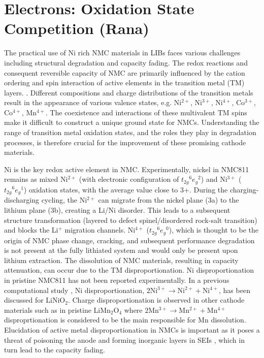 \documentclass[journal=jacsat,manuscript=article]{achemso}
\begin{document}
\section{Electrons: Oxidation State Competition (Rana)}
The practical use of Ni rich NMC materials in LIBs faces various challenges including structural degradation and capacity fading.  The redox reactions and consequent reversible capacity of NMC are primarily influenced by the cation ordering and spin interaction of active elements in the transition metal (TM) layers. \cite{Li-acsami-2020,Maleki-aenm.2019,Feng-2019, Xia2018, Xiao_NanoEner2018}. Different compositions and charge distributions of the transition metals result in the appearance of various valence states, e.g. Ni$^{2+}$, Ni$^{3+}$, Ni$^{4+}$, Co$^{3+}$, Co$^{4+}$, Mn$^{4+}$. \cite{Xiao_NanoEner2018} The coexistence and interactions of these multivalent TM spins make it difficult to construct a unique ground state for NMCs. \cite{Xiao_NanoEner2018} 
Understanding the range of transition metal oxidation states, and the roles they play in degradation processes, is therefore crucial for the improvement of these promising cathode materials.

Ni is the key redox active element in NMC. Experimentally, nickel in NMC811 remains as mixed Ni$^{2+}$ (with electronic configuration of ${t_{2g}}^{6}{e_{g}}^{2}$) and Ni$^{3+}$ (${t_{2g}}^{6}{e_{g}}^{1}$) oxidation states, with the average value close to 3+. \cite{Zhu_JMatChemA2019,Katharina-chemmater,Kondrakov_JPhysChemC2017} During the charging-discharging cycling, the Ni$^{2+}$  can migrate from the nickel plane (3a) to the lithium plane (3b), creating a Li/Ni disorder. \cite{Zhang-acs.chemmater-2019, Feng-2019, Xia2018} This leads to a subsequent structure transformation (layered to defect spinel/disordered rock-salt transition) and blocks the Li$^{+}$  migration channels. \cite{Xia2018} Ni$^{4+}$ (${t_{2g}}^{6}{e_{g}}^{0}$), which is thought to be the origin of NMC phase change, cracking, and subsequent performance degradation is not present at the fully lithiated system and would only be present upon lithium extraction. \cite{Katharina-chemmater,Li-aenm-2019,Li-EER-2020}   
The dissolution of NMC materials, resulting in capacity attenuation, can occur due to the TM disproportionation. \cite{buchberger2015} Ni disproportionation in pristine NMC811 has not been reported experimentally. In a previous computational study \cite{HChen_PhysRevB2011},  Ni disproportionation, $2$Ni$^{3+}\rightarrow$Ni$^{2+} + $Ni$^{4+}$, has been discussed for LiNiO$_2$. Charge disproportionation is observed in other cathode materials such as in pristine LiMn$_2$O$_4$ where  $2$Mn$^{3+}\rightarrow$Mn$^{2+} + $Mn$^{4+}$ disproprtionation is considered to be the main responsible for Mn dissolution. Elucidation of active metal disproportionation in NMCs is important as it poses a threat of poisoning the anode \cite{Parmar-LMO-2020,PASQUALINI2017} and forming inorganic layers in SEIs \cite{joshi2014}, which in turn lead to the capacity fading. 
\end{document}
